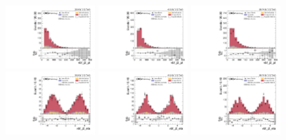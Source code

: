 \begin{figure}[!ht]
  \centering
  \includegraphics[width=0.30\textwidth]{analysis_plots/2016_zv/cr_vjets_l/vbf_j2_pt.pdf}
  \includegraphics[width=0.30\textwidth]{analysis_plots/2017_zv/cr_vjets_l/vbf_j2_pt.pdf}
  \includegraphics[width=0.30\textwidth]{analysis_plots/2018_zv/cr_vjets_l/vbf_j2_pt.pdf} \\
  \includegraphics[width=0.30\textwidth]{analysis_plots/2016_zv/cr_vjets_l/vbf_j2_eta.pdf}
  \includegraphics[width=0.30\textwidth]{analysis_plots/2017_zv/cr_vjets_l/vbf_j2_eta.pdf}
  \includegraphics[width=0.30\textwidth]{analysis_plots/2018_zv/cr_vjets_l/vbf_j2_eta.pdf} \\

\end{figure}
